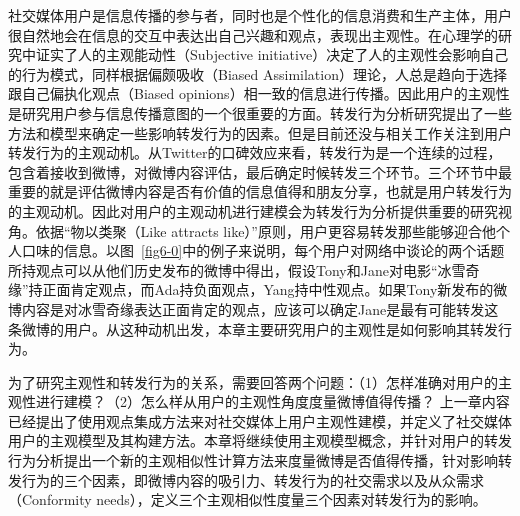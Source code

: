 社交媒体用户是信息传播的参与者，同时也是个性化的信息消费和生产主体，用户很自然地会在信息的交互中表达出自己兴趣和观点，表现出主观性。在心理学的研究中证实了人的主观能动性（Subjective initiative）决定了人的主观性会影响自己的行为模式，同样根据偏颇吸收（Biased Assimilation）理论，人总是趋向于选择跟自己偏执化观点（Biased opinions）相一致的信息进行传播。因此用户的主观性是研究用户参与信息传播意图的一个很重要的方面。转发行为分析研究提出了一些方法和模型来确定一些影响转发行为的因素。但是目前还没与相关工作关注到用户转发行为的主观动机。从Twitter的口碑效应来看，转发行为是一个连续的过程，包含着接收到微博，对微博内容评估，最后确定时候转发三个环节。三个环节中最重要的就是评估微博内容是否有价值的信息值得和朋友分享，也就是用户转发行为的主观动机。因此对用户的主观动机进行建模会为转发行为分析提供重要的研究视角。依据“物以类聚（Like attracts like）”原则，用户更容易转发那些能够迎合他个人口味的信息。以图~\ref{fig6-0}中的例子来说明，每个用户对网络中谈论的两个话题所持观点可以从他们历史发布的微博中得出，假设Tony和Jane对电影“冰雪奇缘”持正面肯定观点，而Ada持负面观点，Yang持中性观点。如果Tony新发布的微博内容是对冰雪奇缘表达正面肯定的观点，应该可以确定Jane是最有可能转发这条微博的用户。从这种动机出发，本章主要研究用户的主观性是如何影响其转发行为。

为了研究主观性和转发行为的关系，需要回答两个问题：（1）怎样准确对用户的主观性进行建模？（2）怎么样从用户的主观性角度度量微博值得传播？
上一章内容已经提出了使用观点集成方法来对社交媒体上用户主观性建模，并定义了社交媒体用户的主观模型及其构建方法。本章将继续使用主观模型概念，并针对用户的转发行为分析提出一个新的主观相似性计算方法来度量微博是否值得传播，针对影响转发行为的三个因素，即微博内容的吸引力、转发行为的社交需求以及从众需求（Conformity needs），定义三个主观相似性度量三个因素对转发行为的影响。

